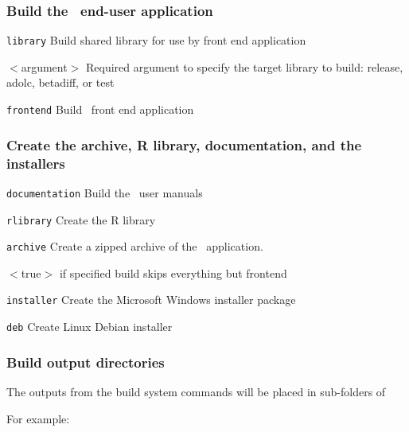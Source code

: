 \subsubsection*{Build the \CNAME\ end-user application}

\begin{description}
  \item{\texttt{library}} Build shared library for use by front end application
  \begin{description}
    \item{$<$argument$>$} Required argument to specify the target library to build: release, adolc, betadiff, or test
  \end{description}
  \item{\texttt{frontend}} Build \CNAME\ front end application
\end{description}

\subsubsection*{Create the archive, R library, documentation, and the \CNAME installers}

\begin{description}
  \item{\texttt{documentation}} Build the \CNAME\ user manuals
  \item{\texttt{rlibrary}} Create the R library
  \item{\texttt{archive}} Create a zipped archive of the \CNAME\ application.
  \begin{description}
     \item{$<$true$>$} if specified build skips everything but frontend
  \end{description}
  \item{\texttt{installer}} Create the Microsoft Windows installer package
  \item{\texttt{deb}} Create Linux Debian installer
\end{description}

\subsubsection*{Build output directories}

The outputs from the build system commands will be placed in sub-folders of 

For example:


